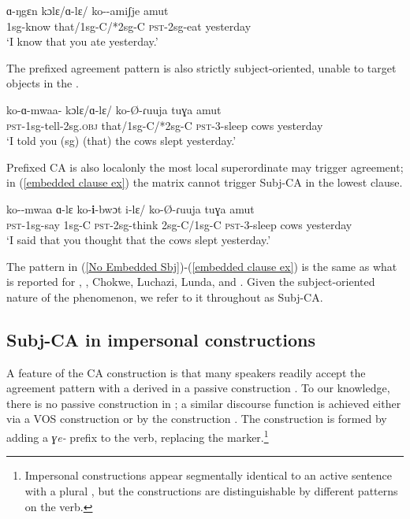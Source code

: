 \documentclass[output=paper
,newtxmath
,modfonts
,nonflat]{langsci/langscibook}
\begin{document}
\ea \label{No Embedded Sbj}
\gll ɑ-ŋgɛn kɔlɛ/ɑ-lɛ/ ko--amiʃje amut \\
1sg-know that/1sg-C/*2sg-C \textsc{pst}-2sg-eat yesterday \\
\glt `I know that you ate yesterday.'
\z

\noindent The prefixed agreement pattern is also strictly subject-oriented, unable to target objects in the .

\ea
\gll ko-ɑ-mwaa- kɔlɛ/ɑ-lɛ/ ko-\O-ɾuuja tuɣa amut \\
\textsc{pst}-1sg-tell-2sg.\textsc{obj} that/1sg-C/*2sg-C \textsc{pst}-3-sleep cows yesterday \\
\glt `I told you (sg) (that) the cows slept yesterday.'
\z

\noindent Prefixed CA is also local\textemdash only the most local superordinate  may trigger agreement; in (\ref{embedded clause ex}) the matrix  cannot trigger Subj-CA in the lowest clause.

\ea \label{embedded clause ex}
\gll ko--mwaa ɑ-lɛ ko-\textbf{i}-bwɔt i-lɛ/ ko-\O-ɾuuja tuɣa amut\\
\textsc{pst}-1sg-say 1sg-C \textsc{pst}-2sg-think 2sg-C/1sg-C \textsc{pst}-3-sleep cows yesterday\\
\glt `I said that you thought that the cows slept yesterday.'
\z

\noindent The pattern in (\ref{No Embedded Sbj})-(\ref{embedded clause ex}) is the same as what is reported for  \citep{Diercks:2013},  \citep{LetsholoSafir:2017}  \citep{Torrence:2016}, Chokwe, Luchazi, Lunda, and  \citep{Kawasha:2007}. Given the subject-oriented nature of the phenomenon, we refer to it throughout as Subj-CA.

\subsection{Subj-CA in impersonal constructions} \label{impersonals} \label{NoImpersonalSubj-CA}

A feature of the  CA construction is that many speakers readily accept the agreement pattern with a derived  in a passive construction \citep{Diercks:2010, Diercks:2013}. To our knowledge, there is no passive construction in ; a similar discourse function is achieved either via a VOS construction or by the  construction \citep[cf.][]{Payne:2011}. The  construction is formed by adding a \textit{ɣe-} prefix to the verb, replacing the  marker.\footnote{Impersonal constructions appear segmentally identical to an active sentence with a  plural , but the constructions are distinguishable by different  patterns on the verb.} 
\end{document}
